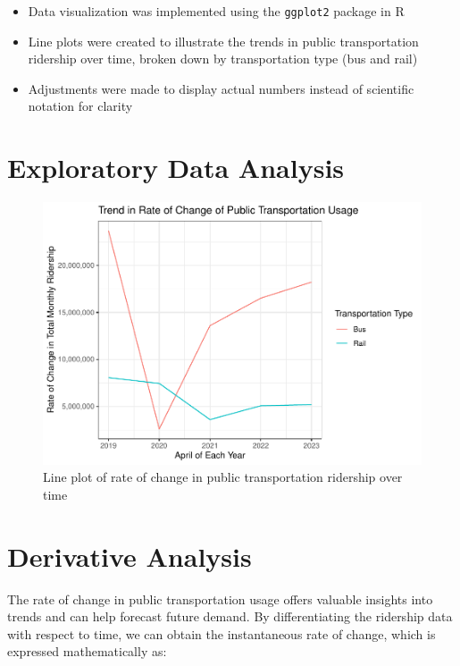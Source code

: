 \documentclass[
]{article}
\providecommand{\tightlist}{%
  \setlength{\itemsep}{0pt}\setlength{\parskip}{0pt}}
\begin{document}
\begin{itemize}
\tightlist
\item
  Data visualization was implemented using the \texttt{ggplot2} package
  in R
\item
  Line plots were created to illustrate the trends in public
  transportation ridership over time, broken down by transportation type
  (bus and rail)
\item
  Adjustments were made to display actual numbers instead of scientific
  notation for clarity
\end{itemize}

\newpage

\hypertarget{exploratory-data-analysis}{%
\section{Exploratory Data Analysis}\label{exploratory-data-analysis}}

\begin{figure}
\centering
\includegraphics{Paper_files/figure-latex/rate-of-change-plot-1.pdf}
\caption{Line plot of rate of change in public transportation ridership
over time}
\end{figure}

\newpage

\hypertarget{derivative-analysis}{%
\section{Derivative Analysis}\label{derivative-analysis}}

The rate of change in public transportation usage offers valuable
insights into trends and can help forecast future demand. By
differentiating the ridership data with respect to time, we can obtain
the instantaneous rate of change, which is expressed mathematically as:
\end{document}
